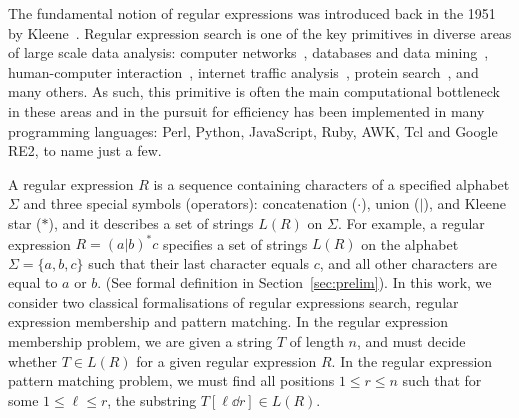 
The fundamental notion of regular expressions was introduced back in the 1951 by Kleene~\cite{RM-704}. Regular expression search is one of the key primitives in diverse areas of large scale data analysis: computer networks~\cite{10.1145/1159913.1159952}, databases and data mining~\cite{1000341,10.5555/645927.672035,10.1145/375551.375569}, human-computer interaction~\cite{10.1145/2207676.2208694}, internet traffic analysis~\cite{4221791,4579527}, protein search~\cite{10.1145/369133.369220}, and many others. As such, this primitive is often the main computational bottleneck in these areas and in the pursuit for efficiency has been implemented in many programming languages:
Perl, Python, JavaScript, Ruby, AWK, Tcl and Google RE2, to name just a few.

A regular expression $R$ is a sequence containing characters of a specified alphabet $\Sigma$ and three special symbols (operators): concatenation ($\cdot$), union ($|$), and Kleene star ($\ast$), and it describes a set of strings $L(R)$ on $\Sigma$. For example, a regular expression $R = (a|b)^\ast c$ specifies a set of strings $L(R)$ on the alphabet $\Sigma = \{a,b,c\}$ such that their last character equals $c$, and all other characters are equal to $a$ or $b$. (See formal definition in Section~\ref{sec:prelim}). In this work, we consider two classical formalisations of regular expressions search, regular expression membership and pattern matching. In the regular expression membership problem, we are given a string $T$ of length $n$, and must decide whether $T \in L(R)$ for a given regular expression $R$. In the regular expression pattern matching problem, we must find all positions $1 \le r \le n$ such that for some $1 \le \ell \le r$, the substring $T[\ell \dd r] \in L(R)$. 

